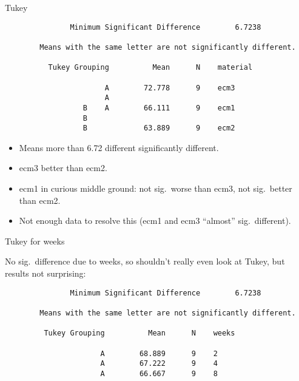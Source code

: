 \documentclass[pdf]{prosper}
\begin{document}
\begin{slide}{Tukey}

{\scriptsize
\begin{verbatim}
               Minimum Significant Difference        6.7238

        Means with the same letter are not significantly different.
 
          Tukey Grouping          Mean      N    material

                       A        72.778      9    ecm3    
                       A                                 
                  B    A        66.111      9    ecm1    
                  B                                      
                  B             63.889      9    ecm2    

\end{verbatim}
}
\begin{itemize}
\item Means more than 6.72 different significantly different.
\item ecm3 better than ecm2.
\item ecm1 in curious middle ground: not sig.\ worse than ecm3, not sig.\ better than ecm2.
\item Not enough data to resolve this (ecm1 and ecm3 ``almost'' sig.\ different). 
\end{itemize}

  
\end{slide}

\begin{slide}{Tukey for weeks}

No sig.\ difference due to weeks, so shouldn't really even look at Tukey, but results not surprising:

{\scriptsize
\begin{verbatim}
               Minimum Significant Difference        6.7238

        Means with the same letter are not significantly different.
 
         Tukey Grouping          Mean      N    weeks

                      A        68.889      9    2    
                      A        67.222      9    4    
                      A        66.667      9    8    

\end{verbatim}
}
  
\end{slide}

  
\end{document}
